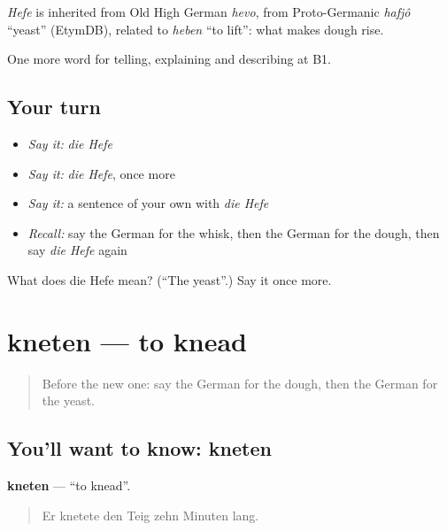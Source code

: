 \begin{cousinweb}
\emph{Hefe} is inherited from Old High German \emph{hevo}, from Proto-Germanic \emph{hafjô} \textquotedblleft{}yeast\textquotedblright{} (EtymDB), related to \emph{heben} \textquotedblleft{}to lift\textquotedblright{}: what makes dough rise.
\end{cousinweb}

\begin{grammarlens}[title={What you've built}]
One more word for telling, explaining and describing at B1.
\end{grammarlens}

\subsection*{Your turn}
\begin{itemize}
\raggedright
  \item \emph{Say it:} \emph{die Hefe}
  \item \emph{Say it:} \emph{die Hefe}, once more
  \item \emph{Say it:} a sentence of your own with \emph{die Hefe}
  \item \emph{Recall:} say the German for the whisk, then the German for the dough, then say \emph{die Hefe} again
\end{itemize}

\begin{tcolorbox}[breakable,colback=teal!4,colframe=teal!35!black,title={Before you move on}]
What does die Hefe mean? (\textquotedblleft{}The yeast\textquotedblright{}.) Say it once more.
\end{tcolorbox}
\section[kneten]{kneten — to knead}

\label{lesson:GE-C325-kneten}



\begin{quote}
Before the new one: say the German for the dough, then the German for the yeast.
\end{quote}

\subsection*{You'll want to know: kneten}
\textbf{kneten} — \textquotedblleft{}to knead\textquotedblright{}.

\begin{quote}
Er knetete den Teig zehn Minuten lang.
\end{quote}

